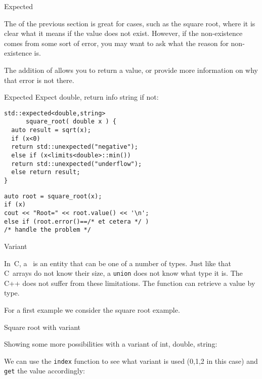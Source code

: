  {Expected}

The  of the previous section is great
for cases, such as the square root, where it is clear
what it means if the value does not exist.
However, if the non-existence comes from some sort of error,
you may want to ask what the reason for non-existence is.

The  addition of 
allows you to return a value, or provide more information
on why that error is not there.
\begin{block}{Expected}
\label{sl:expected}
Expect double, return info string if not:
\begin{multicols}{2}
\begin{lstlisting}
std::expected<double,string> 
      square_root( double x ) {
  auto result = sqrt(x);
  if (x<0)
  return std::unexpected("negative");
  else if (x<limits<double>::min())
  return std::unexpected("underflow");
  else return result;
}
\end{lstlisting}
\columnbreak
\begin{lstlisting}
auto root = square_root(x);
if (x)
cout << "Root=" << root.value() << '\n';
else if (root.error()==/* et cetera */ )
/* handle the problem */
\end{lstlisting}
\end{multicols}
\end{block}

 {Variant}
\label{sec:stl-variant}

In~C, a~ is an entity that can be one of a number
of types. Just like that C~arrays do not know their size, a
\lstinline{union} does not know what type it is. The C++
 does not suffer from these limitations. The
function  can retrieve a value by type.

For a first example we consider the square root example.

\begin{block}{Square root with variant}
  \label{sl:root-variant}
  \begin{multicols}{2}
    \columnbreak
  \end{multicols}
\end{block}

Showing some more possibilities with a variant of int, double, string:

We can use the \lstinline{index} function to see what variant is used
(0,1,2 in this case)
and \lstinline{get} the value accordingly:

